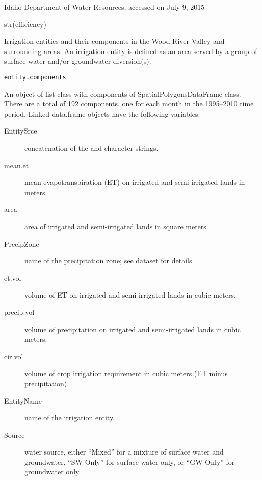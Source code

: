 \documentclass[a4paper]{book}
\begin{document}
%
\begin{Source}\relax
Idaho Department of Water Resources, accessed on July 9, 2015
\end{Source}
%
\begin{Examples}
\begin{ExampleCode}
str(efficiency)

\end{ExampleCode}
\end{Examples}
%
\begin{Description}\relax
Irrigation entities and their components in the Wood River Valley and surrounding areas.
An irrigation entity is defined as an area served by a group of surface-water and/or
groundwater diversion(s).
\end{Description}
%
\begin{Usage}
\begin{verbatim}
entity.components
\end{verbatim}
\end{Usage}
%
\begin{Format}
An object of list class with components of SpatialPolygonsDataFrame-class.
There are a total of 192 components, one for each month in the 1995--2010 time period.
Linked data.frame objects have the following variables:
\begin{description}

\item[EntitySrce] concatenation of the  and  character strings.
\item[mean.et] mean evapotranspiration (ET) on irrigated and semi-irrigated lands in meters.
\item[area] area of irrigated and semi-irrigated lands in square meters.
\item[PrecipZone] name of the precipitation zone;
see  dataset for details.
\item[et.vol] volume of ET on irrigated and semi-irrigated lands in cubic meters.
\item[precip.vol] volume of precipitation on irrigated and semi-irrigated lands in cubic meters.
\item[cir.vol] volume of crop irrigation requirement in cubic meters (ET minus precipitation).
\item[EntityName] name of the irrigation entity.
\item[Source] water source, either ``Mixed'' for a mixture of surface water and groundwater,
``SW Only'' for surface water only, or ``GW Only'' for groundwater only.

\end{description}
\end{Format}
\end{document}
